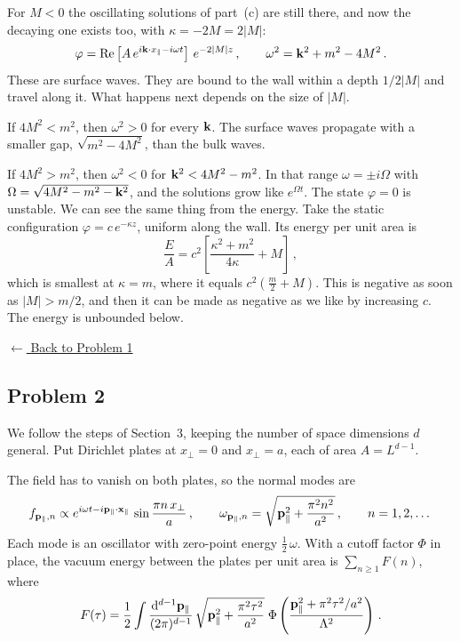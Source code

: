  For $M<0$ the oscillating solutions of part~(c) are still there,
and now the decaying one exists too, with $\kappa=-2M=2|M|$:
\[
\varphi=\operatorname{Re}\left[A\,e^{i\mathbf{k}\cdot x_\parallel-i\omega t}\right]\,e^{-2|M|z}\,,\qquad
\omega^2=\mathbf{k}^2+m^2-4M^2\,.
\]
These are surface waves. They are bound to the wall within a depth $1/2|M|$
and travel along it. What happens next depends on the size of $|M|$.

If $4M^2<m^2$, then $\omega^2>0$ for every $\mathbf{k}$. The surface waves propagate
with a smaller gap, $\sqrt{m^2-4M^2}$, than the bulk waves.

If $4M^2>m^2$, then $\omega^2<0$ for $\mathbf{k}^2<4M^2-m^2$. In that range
$\omega=\pm i\Omega$ with $\Omega=\sqrt{4M^2-m^2-\mathbf{k}^2}$, and the solutions
grow like $e^{\Omega t}$. The state $\varphi=0$ is unstable. We can see the
same thing from the energy. Take the static configuration
$\varphi=c\,e^{-\kappa z}$, uniform along the wall. Its energy per unit area is
\[
\frac EA=c^2\left[\frac{\kappa^2+m^2}{4\kappa}+M\right]\,,
\]
which is smallest at $\kappa=m$, where it equals $c^2\left(\frac m2+M\right)$.
This is negative as soon as $|M|>m/2$, and then it can be made as negative as we
like by increasing $c$. The energy is unbounded below.

\noindent\hyperref[hw:1]{$\leftarrow$ Back to Problem 1}

\subsection{Problem 2}\label{sol:2}

We follow the steps of Section~3, keeping the number of space dimensions $d$
general. Put Dirichlet plates at $x_\perp=0$ and $x_\perp=a$, each of area
$A=L^{d-1}$.

 The field has to vanish on both plates, so the normal modes are
\[
f_{\mathbf{p}_\parallel,n}\propto e^{i\omega t-i\mathbf{p}_\parallel\cdot\mathbf{x}_\parallel}\,\sin\frac{\pi n\,x_\perp}a\,,\qquad
\omega_{\mathbf{p}_\parallel,n}=\sqrt{\mathbf{p}_\parallel^2+\frac{\pi^2n^2}{a^2}}\,,\qquad n=1,2,\dots
\]
Each mode is an oscillator with zero-point energy $\frac12\,\omega$. With a
cutoff factor $\Phi$ in place, the vacuum energy between the plates per unit
area is $\sum_{n\ge1}F(n)$, where
\[
F(\tau)=\frac12\int\frac{\mathop{}\!\mathrm{d}^{d-1}\mathbf{p}_\parallel}{(2\pi)^{d-1}}\,\sqrt{\mathbf{p}_\parallel^2+\frac{\pi^2\tau^2}{a^2}}\;\Phi\left(\frac{\mathbf{p}_\parallel^2+\pi^2\tau^2/a^2}{\Lambda^2}\right)\,.
\]

